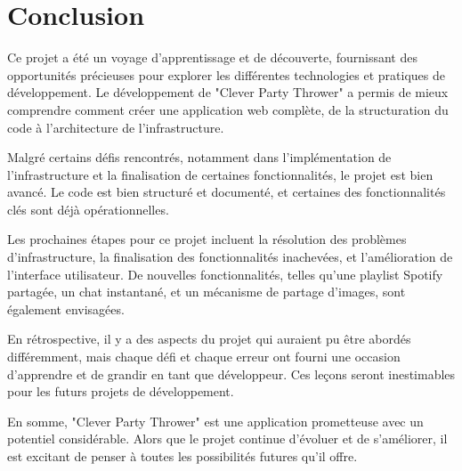 \documentclass[12pt, a4paper, oneside]{article}
\begin{document}
    \section{Conclusion}\label{sec:conclusion}

    Ce projet a été un voyage d'apprentissage et de découverte,
    fournissant des opportunités précieuses pour explorer les différentes technologies et pratiques de développement.
    Le développement de "Clever Party Thrower" a permis de mieux comprendre comment créer une application web complète,
    de la structuration du code à l'architecture de l'infrastructure.

    Malgré certains défis rencontrés, notamment dans l'implémentation de l'infrastructure et la finalisation de certaines fonctionnalités,
    le projet est bien avancé.
    Le code est bien structuré et documenté, et certaines des fonctionnalités clés sont déjà opérationnelles.

    Les prochaines étapes pour ce projet incluent la résolution des problèmes d'infrastructure,
    la finalisation des fonctionnalités inachevées, et l'amélioration de l'interface utilisateur.
    De nouvelles fonctionnalités, telles qu'une playlist Spotify partagée, un chat instantané,
    et un mécanisme de partage d'images, sont également envisagées.

    En rétrospective, il y a des aspects du projet qui auraient pu être abordés différemment,
    mais chaque défi et chaque erreur ont fourni une occasion d'apprendre et de grandir en tant que développeur.
    Ces leçons seront inestimables pour les futurs projets de développement.

    En somme, "Clever Party Thrower" est une application prometteuse avec un potentiel considérable.
    Alors que le projet continue d'évoluer et de s'améliorer, il est excitant de penser à toutes les possibilités futures qu'il offre.





\end{document}

